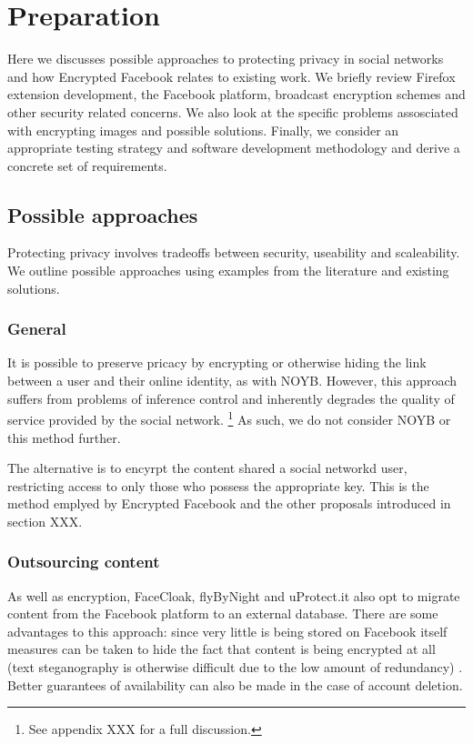 \chapter{Preparation}\label{ch:preparation}

Here we discusses possible approaches to protecting privacy in social networks and how Encrypted Facebook relates to existing work. We briefly review Firefox extension development, the Facebook platform, broadcast encryption schemes and other security related concerns. We also look at the specific problems assosciated with encrypting images and possible solutions. Finally, we consider an appropriate testing strategy and software development methodology and derive a concrete set of requirements.

\section{Possible approaches}
\label{sec:approaches}

Protecting privacy involves tradeoffs between security, useability and scaleability. We outline possible approaches using examples from the literature and existing solutions.


\subsection{General}

It is possible to preserve pricacy by encrypting or otherwise hiding the link between a user and their online identity, as with NOYB. However, this approach suffers from problems of inference control and inherently degrades the quality of service provided by the social network. \footnote{See appendix XXX for a full discussion.} As such, we do not consider NOYB or this method further.

The alternative is to encyrpt the content shared a social networkd user, restricting access to only those who possess the appropriate key. This is the method emplyed by Encrypted Facebook and the other proposals introduced in section XXX.


\subsection{Outsourcing content}

As well as encryption, FaceCloak, flyByNight and uProtect.it also opt to migrate content from the Facebook platform to an external database. There are some advantages to this approach: since very little is being stored on Facebook itself measures can be taken to hide the fact that content is being encrypted at all (text steganography is otherwise difficult due to the low amount of redundancy) \cite{facecloak}. Better guarantees of availability can also be made in the case of account deletion.

